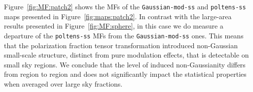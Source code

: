 \documentclass[twocolumn]{aastex631}
\newcommand{\giuse}[1]{\textcolor{orange}{(GP: #1)}}
\begin{document}
Figure~\ref{fig:MF:patch2} shows the MFs of the \texttt{Gaussian-mod-ss} and \texttt{poltens-ss} maps presented in Figure~\ref{fig:maps:patch2}. In contrast with the large-area results presented in Figure~\ref{fig:MF:sphere}, in this case we do measure a departure of the \texttt{poltens-ss} MFs from the \texttt{Gaussian-mod-ss} ones. %
This means that the polarization fraction tensor transformation introduced non-Gaussian small-scale structure, distinct from pure modulation effects, that is detectable on small sky regions. 
We conclude that the level of induced non-Gaussianity differs from region to region and does not significantly impact the statistical properties when averaged over large sky fractions.


\end{document}
